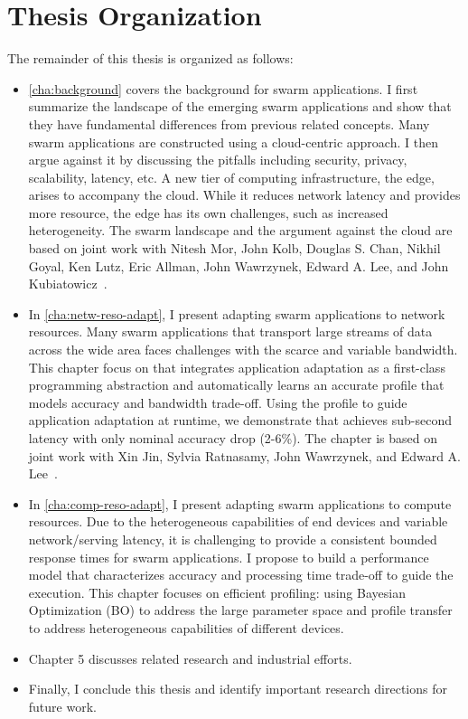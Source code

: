\documentclass[thesis.tex]{subfiles}
\begin{document}
\section{Thesis Organization}
\label{sec:thesis-organization}

The remainder of this thesis is organized as follows:

\begin{itemize}[topsep=5pt]
\item \autoref{cha:background} covers the background for swarm applications. I
  first summarize the landscape of the emerging swarm applications and show that
  they have fundamental differences from previous related concepts.  Many swarm
  applications are constructed using a cloud-centric approach. I then argue
  against it by discussing the pitfalls including security, privacy,
  scalability, latency, etc. A new tier of computing infrastructure, the edge,
  arises to accompany the cloud. While it reduces network latency and provides
  more resource, the edge has its own challenges, such as increased
  heterogeneity. The swarm landscape and the argument against the cloud are
  based on joint work with Nitesh Mor, John Kolb, Douglas S. Chan, Nikhil Goyal,
  Ken Lutz, Eric Allman, John Wawrzynek, Edward A. Lee, and John
  Kubiatowicz~\cite{zhang2015cloud}.
\item In \autoref{cha:netw-reso-adapt}, I present adapting swarm applications to
  network resources. Many swarm applications that transport large streams of
  data across the wide area faces challenges with the scarce and variable
  bandwidth. This chapter focus on \awstream{} that integrates application
  adaptation as a first-class programming abstraction and automatically learns
  an accurate profile that models accuracy and bandwidth trade-off. Using the
  profile to guide application adaptation at runtime, we demonstrate that
  \awstream{} achieves sub-second latency with only nominal accuracy drop
  (2-6\%).  The chapter is based on joint work with Xin Jin, Sylvia Ratnasamy,
  John Wawrzynek, and Edward A. Lee~\cite{zhang2018awstream}.
\item In \autoref{cha:comp-reso-adapt}, I present adapting swarm applications to
  compute resources. Due to the heterogeneous capabilities of end devices and
  variable network/serving latency, it is challenging to provide a consistent
  bounded response times for swarm applications. I propose to build a
  performance model that characterizes accuracy and processing time trade-off to
  guide the execution. This chapter focuses on efficient profiling: using
  Bayesian Optimization (BO) to address the large parameter space and profile
  transfer to address heterogeneous capabilities of different devices.
\item Chapter 5 discusses related research and industrial efforts.
\item Finally, I conclude this thesis and identify important research directions
  for future work.
\end{itemize}
\end{document}
